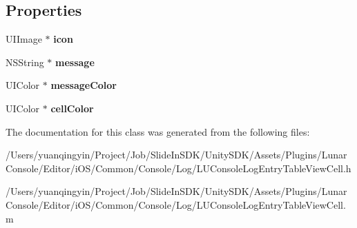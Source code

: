 \subsection*{Properties}
\begin{DoxyCompactItemize}
\item 
\mbox{\label{interface_l_u_console_log_entry_table_view_cell_ad97767f46385586065f2bd1f8ffc9b7f}} 
U\+I\+Image $\ast$ {\bfseries icon}
\item 
\mbox{\label{interface_l_u_console_log_entry_table_view_cell_a7ac619a3ec11e5e73310030e76503f46}} 
N\+S\+String $\ast$ {\bfseries message}
\item 
\mbox{\label{interface_l_u_console_log_entry_table_view_cell_aa428a7825b48043e0314f15f6ac2400a}} 
U\+I\+Color $\ast$ {\bfseries message\+Color}
\item 
\mbox{\label{interface_l_u_console_log_entry_table_view_cell_aa2362b95c634ed0bd0ef45e1cbe9c911}} 
U\+I\+Color $\ast$ {\bfseries cell\+Color}
\end{DoxyCompactItemize}


The documentation for this class was generated from the following files\+:\begin{DoxyCompactItemize}
\item 
/\+Users/yuanqingyin/\+Project/\+Job/\+Slide\+In\+S\+D\+K/\+Unity\+S\+D\+K/\+Assets/\+Plugins/\+Lunar\+Console/\+Editor/i\+O\+S/\+Common/\+Console/\+Log/L\+U\+Console\+Log\+Entry\+Table\+View\+Cell.\+h\item 
/\+Users/yuanqingyin/\+Project/\+Job/\+Slide\+In\+S\+D\+K/\+Unity\+S\+D\+K/\+Assets/\+Plugins/\+Lunar\+Console/\+Editor/i\+O\+S/\+Common/\+Console/\+Log/L\+U\+Console\+Log\+Entry\+Table\+View\+Cell.\+m\end{DoxyCompactItemize}
